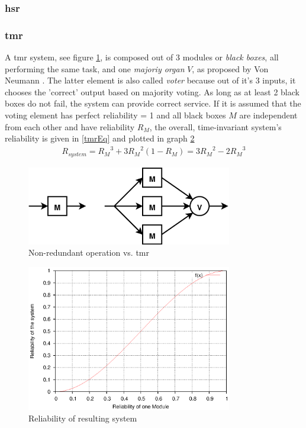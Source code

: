\subsubsection{\gls{hsr}}


\subsubsection{\gls{tmr}}
A \gls{tmr} system, see figure \ref{fig:tmr}, is composed out of 3 modules or \textit{black boxes}, all performing the same task,	
and one \textit{majoriy organ} $V$, as proposed by Von Neumann \cite{vN56}. The latter element
is also called \textit{voter} because out of it's 3 inputs, it chooses the 'correct' output based on majority voting. As long as at least 2 black boxes do not
fail, the system can provide correct service. If it is assumed that the voting element has perfect reliability = 1 and all black boxes $M$ are independent from
each other and have reliability $R_M$, the overall, time-invariant system's reliability is given in \ref{tmrEq} \cite{Lyons:1962:UTR:1661979.1661984} and plotted in graph \ref{fig:tmrGrp}
\begin{align}\label{tmrEq}
 R_{system} = {R_M}^3 + 3{R_M}^2(1-R_M) = 3{R_M}^2 - 2{R_M}^3
\end{align}
\begin{figure}
    \centering
    \includegraphics[width=0.8\textwidth]{figures/tmr.eps}
    \caption{Non-redundant operation vs. \gls{tmr}}
    \label{fig:tmr}
\end{figure}
\begin{figure}
    \centering
    \includegraphics[width=0.8\textwidth]{figures/tmrGraph.eps}
    \caption{Reliability of resulting system}
    \label{fig:tmrGrp}
\end{figure}
